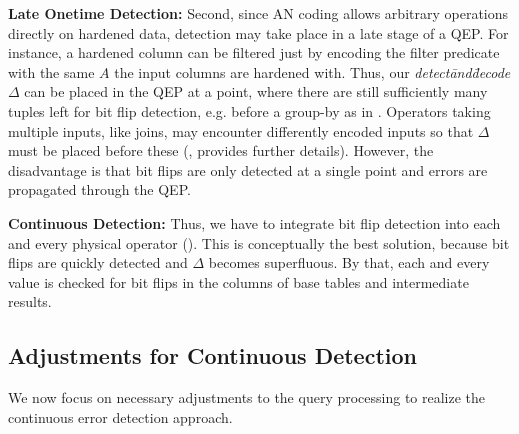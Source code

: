 \textbf{Late Onetime Detection: }
Second, since AN coding allows arbitrary operations directly on hardened data, detection may take place in a late stage of a QEP. For instance, a hardened column can be filtered just by encoding the filter predicate with the same \(A\) the input columns are hardened with. Thus, our \emph{detect\=and\=decode} \(\Delta\) can be placed in the QEP at a point, where there are still sufficiently many tuples left for bit flip detection, e.g. before a group-by as in . Operators taking multiple inputs, like joins, may encounter differently encoded inputs so that \(\Delta\) must be placed before these (,  provides further details). However, the disadvantage is that bit flips are only detected at a single point and errors are propagated through the QEP. 


\textbf{Continuous Detection: }
Thus, we have to integrate bit flip detection into each and every physical operator (). This is conceptually the best solution, because bit flips are quickly detected and \(\Delta\) becomes superfluous. By that, each and every value is checked for bit flips in the columns of base tables and intermediate results.

\subsection{Adjustments for Continuous Detection}
\label{sec:AdjustmentsForContinuous}

We now focus on necessary adjustments to the query processing to realize the continuous error detection approach. 

